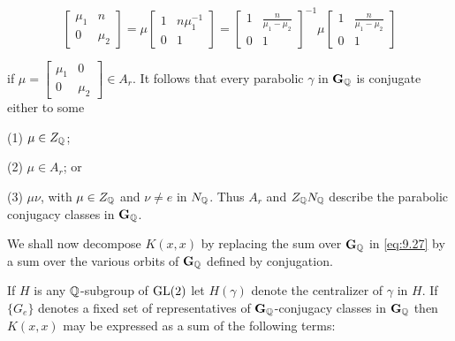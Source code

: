 \[
\begin{bmatrix} \mu_1 & n \\ 0 & \mu_2 \end{bmatrix} = \mu\begin{bmatrix} 1 & n\mu_1^{-1} \\ 0 & 1 \end{bmatrix} = \begin{bmatrix} 1 & \frac{n}{\mu_1 - \mu_2} \\ 0 & 1 \end{bmatrix}^{-1}\mu\begin{bmatrix} 1 & \frac{n}{\mu_1 - \mu_2} \\ 0 & 1 \end{bmatrix}
\]

if $\mu = \begin{bmatrix} \mu_1 & 0 \\ 0 & \mu_2 \end{bmatrix} \in A_r$. It follows that every parabolic $\gamma$ in $\mathbf{G}_{\mathbb{Q}}$ is conjugate either to some

(1) $\mu \in Z_{\mathbb{Q}}$;

(2) $\mu \in A_r$; or

(3) $\mu\nu$, with $\mu \in Z_{\mathbb{Q}}$ and $\nu \neq e$ in $N_{\mathbb{Q}}$. Thus $A_r$ and $Z_{\mathbb{Q}} N_{\mathbb{Q}}$ describe the parabolic conjugacy classes in $\mathbf{G}_{\mathbb{Q}}$.

We shall now decompose $K(x,x)$ by replacing the sum over $\mathbf{G}_{\mathbb{Q}}$ in \eqref{eq:9.27} by a sum over the various orbits of $\mathbf{G}_{\mathbb{Q}}$ defined by conjugation.

If $H$ is any $\mathbb{Q}$-subgroup of $\operatorname{GL}(2)$ let $H(\gamma)$ denote the centralizer of $\gamma$ in $H$. If $\{G_e\}$ denotes a fixed set of representatives of $\mathbf{G}_{\mathbb{Q}}$-conjugacy classes in $\mathbf{G}_{\mathbb{Q}}$ then $K(x, x)$ may be expressed as a sum of the following terms:


